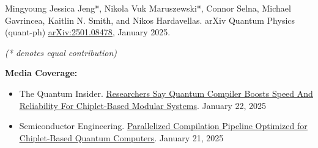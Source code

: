 \hfill\begin{minipage}{\dimexpr\textwidth-24pt}\small
Mingyoung Jessica Jeng*, Nikola Vuk Maruszewski*, Connor Selna, Michael Gavrincea, Kaitlin N. Smith,
and Nikos Hardavellas. arXiv Quantum Physics (quant-ph)
\href{https://arxiv.org/abs/2501.08478}{\ul{arXiv:2501.08478}}, January 2025.

\vspace{2pt}
\hspace{12pt}\textit{(* denotes equal contribution)}

\vspace{4pt}
\textbf{Media Coverage:}
\begin{itemize}[topsep=0pt,itemsep=0pt]
  \item The Quantum
    Insider. \href{https://thequantuminsider.com/2025/01/22/researchers-say-quantum-compiler-boosts-speed-and-reliability-for-chiplet-based-modular-systems/}{\ul{Researchers
        Say Quantum Compiler Boosts Speed And Reliability For Chiplet-Based Modular Systems}}. January 22, 2025
  \item Semiconductor Engineering. \href{https://semiengineering.com/parallelized-compilation-pipeline-optimized-for-chiplet-based-quantum-computers/}{\ul{Parallelized
      Compilation Pipeline Optimized for Chiplet-Based Quantum Computers}}. January 21, 2025
\end{itemize}
\end{minipage}






\resumeSubHeadingListEnd


